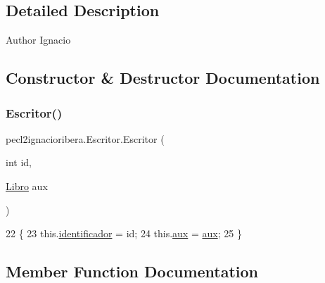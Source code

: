 \subsection{Detailed Description}
\begin{DoxyAuthor}{Author}
Ignacio 
\end{DoxyAuthor}


\subsection{Constructor \& Destructor Documentation}
\mbox{\label{classpecl2ignacioribera_1_1_escritor_a8ce7faa85a696b534b796fa339f8716b}} 
\subsubsection{\texorpdfstring{Escritor()}{Escritor()}}
{\footnotesize\ttfamily pecl2ignacioribera.\+Escritor.\+Escritor (\begin{DoxyParamCaption}\item[{int}]{id,  }\item[{\mbox{\hyperlink{classpecl2ignacioribera_1_1_libro}{Libro}}}]{aux }\end{DoxyParamCaption})\hspace{0.3cm}{\ttfamily [inline]}}


\begin{DoxyCode}
22     \{
23         this.\mbox{\hyperlink{classpecl2ignacioribera_1_1_escritor_a99af112e84645111c4d03268058170ee}{identificador}} = id;
24         this.\mbox{\hyperlink{classpecl2ignacioribera_1_1_escritor_ab1609b43aaa7b7fd72926798e8382b14}{aux}} = \mbox{\hyperlink{classpecl2ignacioribera_1_1_escritor_ab1609b43aaa7b7fd72926798e8382b14}{aux}};
25     \}
\end{DoxyCode}


\subsection{Member Function Documentation}
\mbox{\label{classpecl2ignacioribera_1_1_escritor_afa4376cb9e3eec9b801eeb0d999f920a}} 
